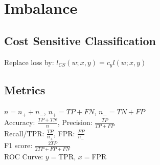 \section*{Imbalance}

\subsection*{Cost Sensitive Classification}
Replace loss by: $l_{CS}(w;x,y) = c_y l(w;x,y)$

\subsection*{Metrics}
$n = n_+ + n_-$, $n_+ = TP + FN$, $n_- = TN + FP$\\
Accuracy: $\frac{TP+TN}{n}$, 
Precision: $\frac{TP}{TP+FP}$\\ 
Recall/TPR: $\frac{TP}{n_+}$, 
FPR: $ \frac{FP}{n_-}$\\
F1 score: $\frac{2TP}{2TP+FP+FN}$\\
ROC Curve: $y = $TPR, $x = $FPR